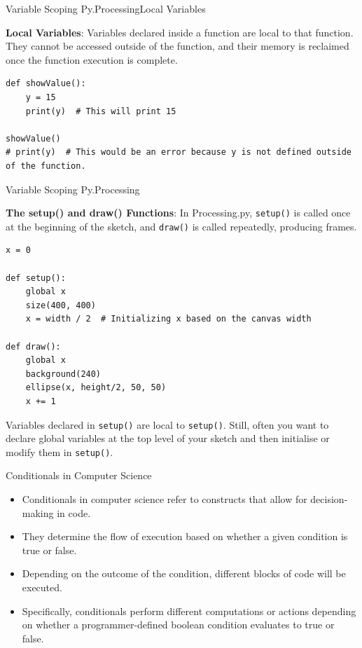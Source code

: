 \documentclass[10pt]{beamer}
\begin{document}

\begin{frame}[fragile]{Variable Scoping Py.Processing}{Local Variables }
  
  \textbf{Local Variables}: Variables declared inside a function are
  local to that function. They cannot be accessed outside of the
  function, and their memory is reclaimed once the function execution is
  complete.
  \begin{lstlisting}
def showValue():
    y = 15
    print(y)  # This will print 15
    
showValue()
# print(y)  # This would be an error because y is not defined outside of the function.\end{lstlisting}	

\end{frame}


\begin{frame}[fragile]{Variable Scoping Py.Processing}

\textbf{The setup() and draw() Functions}: In Processing.py,
\texttt{setup()} is called once at the beginning of the sketch, and
\texttt{draw()} is called repeatedly, producing frames. 
\begin{lstlisting}
x = 0

def setup():
    global x
    size(400, 400)
    x = width / 2  # Initializing x based on the canvas width
    
def draw():
    global x
    background(240)
    ellipse(x, height/2, 50, 50)
    x += 1
\end{lstlisting}

Variables declared in \texttt{setup()} are local to \texttt{setup()}. Still, often you want to declare global variables at the top level of your sketch and then initialise or modify them in \texttt{setup()}.

\end{frame}

\begin{frame}{Conditionals in Computer Science}
\begin{itemize}
\item Conditionals in computer science refer to constructs that allow for decision-making in code. 
\item They determine the flow of execution based on whether a given condition is true or false. 
\item Depending on the outcome of the condition, different blocks of code will be executed.
\item Specifically, conditionals perform different computations or actions depending on whether a programmer-defined boolean condition evaluates to true or false.
\end{itemize}
\end{frame}
\end{document}
